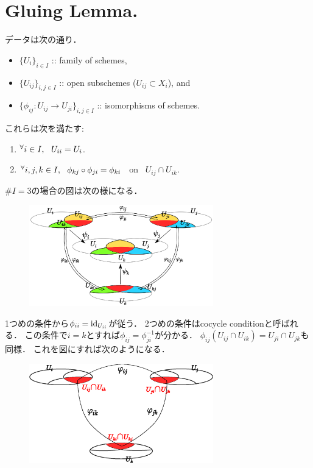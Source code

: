 \documentclass[a4paper]{jsarticle}
\begin{document}
\section{Gluing Lemma.} %
    データは次の通り．
    \begin{itemize}
        \item $\{U_i\}_{i \in I}$ :: family of schemes,
        \item $\{U_{ij}\}_{i,j \in I}$ :: open subschemes ($U_{ij} \subset X_i$), and
        \item $\{\phi_{ij}:U_{ij} \to U_{ji}\}_{i,j \in I}$ :: isomorphisms of schemes.
    \end{itemize}
    これらは次を満たす:
    \begin{enumerate}[label=(\arabic*)]
        \item ${}^{\forall} i \in I,~~ U_{ii}=U_i$.
        \item ${}^{\forall} i,j,k \in I,~~ \phi_{kj} \circ \phi_{ji}=\phi_{ki}$ ~on~ $U_{ij} \cap U_{ik}$.
    \end{enumerate}
    $\#I=3$の場合の図は次の様になる．
    \begin{figure}[ht]
    \begin{center}
        \includegraphics[width=8cm]{./images/gluing.eps}
    \end{center}
    \end{figure}

    1つめの条件から$\phi_{ii}=\mathrm{id}_{U_{ii}}$が従う．
    2つめの条件はcocycle conditionと呼ばれる．
    この条件で$i=k$とすれば$\phi_{ij}=\phi_{ji}^{-1}$が分かる．
    $\phi_{ij}(U_{ij} \cap U_{ik})=U_{ji} \cap U_{jk}$も同様．
    これを図にすれば次のようになる．
    \begin{figure}[ht]
    \begin{center}
        \includegraphics[width=8cm]{./images/cocycle_cond.eps}
    \end{center}
    \end{figure}
\end{document}
